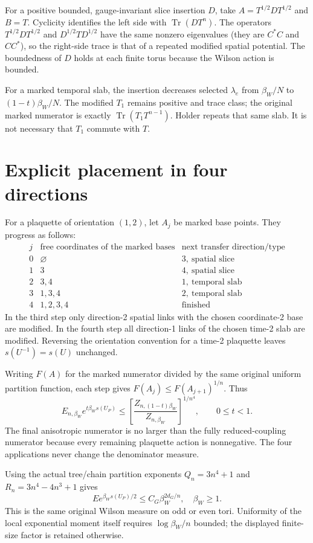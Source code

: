 \documentclass{article}
\begin{document}
For a positive bounded, gauge-invariant slice insertion $D$, take
$A=T^{1/2}DT^{1/2}$ and $B=T$. Cyclicity identifies the left side with $\operatorname{Tr}(DT^n)$. The operators $T^{1/2}DT^{1/2}$ and $D^{1/2}TD^{1/2}$ have the same nonzero eigenvalues (they are $C^*C$ and $CC^*$), so the right-side trace is that of a repeated modified spatial potential. The boundedness of $D$ holds at each finite torus because the Wilson action is bounded.

For a marked temporal slab, the insertion decreases selected $\lambda_e$ from $\beta_W/N$ to $(1-t)\beta_W/N$. The modified $T_1$ remains positive and trace class; the original marked numerator is exactly $\operatorname{Tr}(T_1T^{n-1})$. Holder repeats that same slab. It is not necessary that $T_1$ commute with $T$.

\section{Explicit placement in four directions}
For a plaquette of orientation $(1,2)$, let $A_j$ be marked base points. They progress as follows:
\[
\begin{array}{c|c|c}
 j&\text{free coordinates of the marked bases}&\text{next transfer direction/type}\\\hline
0&\varnothing&3,\ \text{spatial slice}\\
1&3&4,\ \text{spatial slice}\\
2&3,4&1,\ \text{temporal slab}\\
3&1,3,4&2,\ \text{temporal slab}\\
4&1,2,3,4&\text{finished}
\end{array}
\]
In the third step only direction-2 spatial links with the chosen coordinate-2 base are modified. In the fourth step all direction-1 links of the chosen time-2 slab are modified. Reversing the orientation convention for a time-2 plaquette leaves $s(U^{-1})=s(U)$ unchanged.

Writing $F(A)$ for the marked numerator divided by the same original uniform partition function, each step gives $F(A_j)\leq F(A_{j+1})^{1/n}$. Thus
\[
 E_{n,\beta_W}e^{t\beta_Ws(U_P)}
 \leq\left[\frac{Z_{n,(1-t)\beta_W}}{Z_{n,\beta_W}}\right]^{1/n^4},
 \qquad 0\leq t<1.
 \tag{2}
\]
The final anisotropic numerator is no larger than the fully reduced-coupling numerator because every remaining plaquette action is nonnegative. The four applications never change the denominator measure.

Using the actual tree/chain partition exponents $Q_n=3n^4+1$ and $R_n=3n^4-4n^3+1$ gives
\[
 E e^{\beta_Ws(U_P)/2}\leq C_G\beta_W^{2d_G/n},\quad\beta_W\geq1.
 \tag{3}
\]
This is the same original Wilson measure on odd or even tori. Uniformity of the local exponential moment itself requires $\log\beta_W/n$ bounded; the displayed finite-size factor is retained otherwise.
\end{document}
